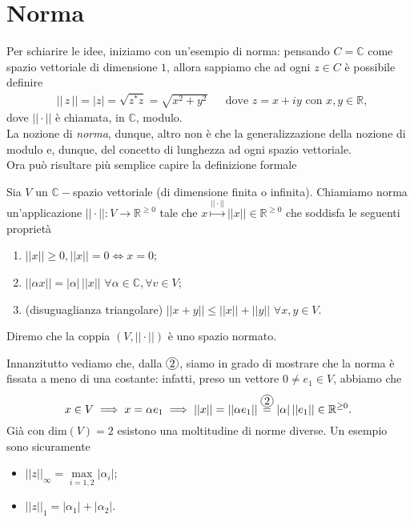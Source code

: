 \documentclass[12pt, twoside, italian, openany]{book}
\begin{document}
	\section{Norma}
	Per schiarire le idee, iniziamo con un'esempio di norma: pensando $C = \mathbb{C}$ come spazio vettoriale di dimensione $1$, allora sappiamo che ad ogni $z \in C$ è possibile definire
	\begin{align*}
		&|| \, z \, || = | z | = \sqrt{z^* z} = \sqrt{x^2 + y^2} & &\text{dove } z = x+iy \text{ con } x, y \in \mathbb{R},
	\end{align*}
	dove $||\cdot||$ è chiamata, in $\mathbb{C}$, modulo. \\
	La nozione di \emph{norma}, dunque, altro non è che la generalizzazione della nozione di modulo e, dunque, del concetto di lunghezza ad ogni spazio vettoriale. \\
	Ora può risultare più semplice capire la definizione formale
	\begin{definition}[norma]
		Sia $V$ un $\mathbb{C}-$spazio vettoriale (di dimensione finita o infinita). Chiamiamo norma un'applicazione $||\cdot||: V \to \mathbb{R}^{\geq 0}$ tale che $x \stackrel{||\cdot||}{\mapsto} ||x|| \in \mathbb{R}^{\geq 0}$ che soddisfa le seguenti proprietà
		\begin{enumerate}[label=\protect\circled{\arabic*}]
			\item $||x|| \geq 0, ||x|| = 0 \iff x = 0$;
			\item $||\alpha x || = |\alpha| \, ||x|| \, \, \forall \alpha \in \mathbb{C}, \forall v \in V$;
			\item (disuguaglianza triangolare) $||x+y|| \leq ||x|| + ||y|| \, \, \forall x, y \in V$.
		\end{enumerate}
		Diremo che la coppia $(V, ||\cdot||)$ è uno spazio normato. 
	\end{definition}
	Innanzitutto vediamo che, dalla $\circled{2}$, siamo in grado di mostrare che la norma è fissata a meno di una costante: infatti, preso un vettore $0 \neq e_1 \in V$, abbiamo che
	$$
		x \in V \implies x = \alpha e_1 \implies ||x|| = ||\alpha e_1|| \stackrel{\circled{2}}{=} |\alpha| \, || e_1 || \in \mathbb{R}^{\geq 0}.
	$$
	Già con $\text{dim}(V)=2$ esistono una moltitudine di norme diverse. Un esempio sono sicuramente
	\begin{itemize}
		\item $||z||_{\infty} = \max\limits_{i=1,2} |\alpha_{i}|$;
		\item $||z||_1 = |\alpha_1| + |\alpha_2|$.
	\end{itemize}
\end{document}
